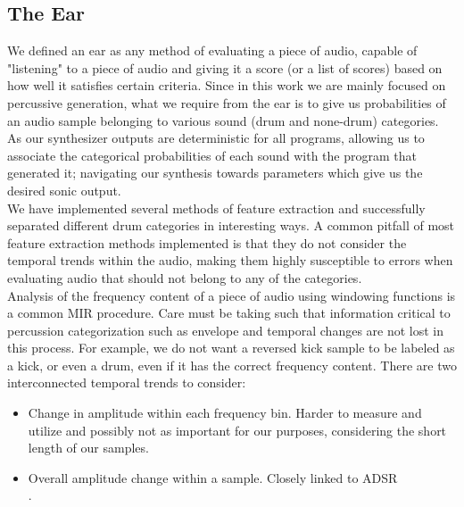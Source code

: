 \documentclass{nime-alternate} %
\begin{document}
\subsection{The Ear}
We defined an ear as any method of evaluating a piece of audio, capable of "listening" to a piece of audio and giving it a score (or a list of scores) based on how well it satisfies certain criteria. Since in this work we are mainly focused on percussive generation, what we require from the ear is to give us probabilities of an audio sample belonging to various sound (drum and none-drum) categories. As our synthesizer outputs are deterministic for all programs, allowing us to associate the categorical probabilities of each sound with the program that generated it; navigating our synthesis towards parameters which give us the desired sonic output.\\
We have implemented several methods of feature extraction and successfully separated different drum categories in interesting ways. 
A common pitfall of most feature extraction methods implemented is that they do not consider the temporal trends within the audio, making them highly susceptible to errors when evaluating audio that should not belong to any of the categories.\\
Analysis of the frequency content of a piece of audio using windowing functions is a common MIR procedure. Care must be taking such that information critical to percussion categorization such as envelope and temporal changes are not lost in this process. For example, we do not want a reversed kick sample to be labeled as a kick, or even a drum, even if it has the correct frequency content. There are two interconnected temporal trends to consider: 
\begin{itemize}
    \item Change in amplitude within each frequency bin. Harder to measure and utilize and possibly not as important for our purposes, considering the short length of our samples.
    \item Overall amplitude change within a sample. Closely linked to ADSR\\. 
\end{itemize}{}
\end{document}
